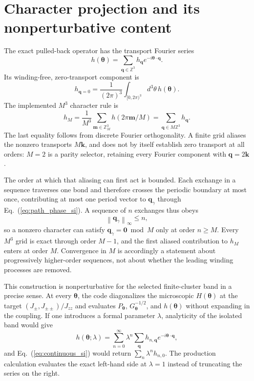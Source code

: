 \documentclass[aps,prl,onecolumn,amsmath,amssymb]{revtex4-2}
\newcommand{\Jzz}{J_{zz}}
\newcommand{\Jpm}{J_{\pm}}
\newcommand{\Jpp}{J_{\pm\pm}}
\newcommand{\bq}{\bm q}
\newcommand{\btheta}{\bm\theta}
\begin{document}
\section{Character projection and its nonperturbative content}

The exact pulled-back operator has the transport Fourier series
\begin{equation}
 h(\btheta)=\sum_{\bq\in\mathbb Z^3}h_{\bq}
 e^{-i\btheta\cdot\bq}.
\label{eq:fourier_si}
\end{equation}
Its winding-free, zero-transport component is
\begin{equation}
 h_{\bq=0}=\frac{1}{(2\pi)^3}\int_{[0,2\pi)^3}
 d^3\theta\,h(\btheta).
\label{eq:continuous_si}
\end{equation}
The implemented $M^3$ character rule is
\begin{equation}
 h_M=\frac{1}{M^3}\sum_{\bm m\in\mathbb Z_M^3}
 h(2\pi\bm m/M)
 =\sum_{\bq\in M\mathbb Z^3}h_{\bq}.
\label{eq:alias}
\end{equation}
The last equality follows from discrete Fourier orthogonality.  A finite grid
aliases the nonzero transports $M\bm k$, and does not by itself establish zero
transport at all orders: $M=2$ is a parity selector, retaining every Fourier
component with $\bq=2\bm k$.

The order at which that aliasing can first act is bounded.  Each exchange in a
sequence traverses one bond and therefore crosses the periodic boundary at
most once, contributing at most one period vector to $\bq_\gamma$ through
Eq.~(\ref{eq:path_phase_si}).  A sequence of $n$ exchanges thus obeys
\begin{equation}
 \left\|\bq_\gamma\right\|_{\infty}\le n ,
\label{eq:transport_bound_si}
\end{equation}
so a nonzero character can satisfy $\bq_\gamma=\bm0\bmod M$ only at order
$n\ge M$.  Every $M^3$ grid is exact through order $M-1$, and the first
aliased contribution to $h_M$ enters at order $M$.  Convergence in $M$ is
accordingly a statement about progressively higher-order sequences, not about
whether the leading winding processes are removed.

This construction is nonperturbative for the selected finite-cluster band in
a precise sense.  At every $\btheta$, the code diagonalizes the microscopic
$H(\btheta)$ at the target $(\Jpm,\Jpp)/\Jzz$ and evaluates
$P_{\btheta}$, $G_{\btheta}^{-1/2}$, and $h(\btheta)$ without expanding in the
coupling.  If one introduces a formal parameter $\lambda$, analyticity of the
isolated band would give
\begin{equation}
 h(\btheta;\lambda)=\sum_{n=0}^{\infty}\lambda^n
 \sum_{\bq}h_{n,\bq}e^{-i\btheta\cdot\bq},
\end{equation}
and Eq.~(\ref{eq:continuous_si}) would return
$\sum_n\lambda^nh_{n,0}$.  The production calculation evaluates the exact
left-hand side at $\lambda=1$ instead of truncating the series on the right.
\end{document}

